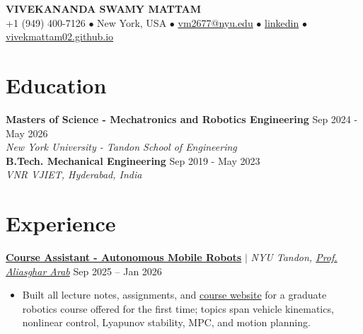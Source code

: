 \documentclass[10pt,letterpaper]{article}
\begin{document}
\begin{center}
    {\Large \textbf{VIVEKANANDA SWAMY MATTAM}} \\
    \vspace{4pt}
    \small
    +1 (949) 400-7126 $\bullet$ New York, USA $\bullet$ \href{mailto:vm2677@nyu.edu}{vm2677@nyu.edu} $\bullet$ \href{https://linkedin.com/in/vivek-mattam-a8590b23a}{linkedin} $\bullet$ \href{https://vivekmattam02.github.io}{vivekmattam02.github.io}
\end{center}
\vspace{-4pt}

\section{Education}

\textbf{Masters of Science - Mechatronics and Robotics Engineering} \hfill Sep 2024 - May 2026 \\
\textit{New York University - Tandon School of Engineering} \\[2pt]
\textbf{B.Tech. Mechanical Engineering} \hfill Sep 2019 - May 2023 \\
\textit{VNR VJIET, Hyderabad, India}
\vspace{-2pt}

\section{Experience}

\href{https://wp.nyu.edu/aarab/}{\textbf{Course Assistant - Autonomous Mobile Robots}} $|$ \textit{NYU Tandon, \href{https://wp.nyu.edu/aarab/}{Prof. Aliasghar Arab}} \hfill Sep 2025 -- Jan 2026
\begin{itemize}
    \item Built all lecture notes, assignments, and \href{https://vivekmattam02.github.io/amr-notes/}{course website} for a graduate robotics course offered for the first time; topics span vehicle kinematics, nonlinear control, Lyapunov stability, MPC, and motion planning.
\end{itemize}
\vspace{1pt}
\end{document}

